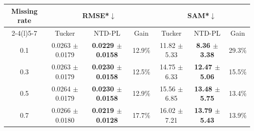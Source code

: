 \begin{tabular}{@{}c c c c c c c@{}}
\toprule
\multirow{2}{*}{Missing rate} &
\multicolumn{3}{c}{RMSE*$\downarrow$} &
\multicolumn{3}{c}{SAM*$\downarrow$} \\
\cmidrule(lr){2-4}\cmidrule(l){5-7}
& Tucker & NTD-PL & Gain
& Tucker & NTD-PL & Gain \\
\midrule
0.1 & 0.0263 \(\pm\) 0.0179 & \textbf{0.0229 \(\pm\) 0.0158} & 12.9\%
& 11.82 \(\pm\) 5.33 & \textbf{8.36 \(\pm\) 3.38} & 29.3\% \\
0.3 & 0.0263 \(\pm\) 0.0179 & \textbf{0.0230 \(\pm\) 0.0158} & 12.5\%
& 14.75 \(\pm\) 6.33 & \textbf{12.47 \(\pm\) 5.06} & 15.5\% \\
0.5 & 0.0264 \(\pm\) 0.0179 & \textbf{0.0230 \(\pm\) 0.0158} & 12.9\%
& 15.56 \(\pm\) 6.85 & \textbf{13.48 \(\pm\) 5.75} & 13.4\% \\
0.7 & 0.0266 \(\pm\) 0.0180 & \textbf{0.0219 \(\pm\) 0.0128} & 17.7\%
& 16.02 \(\pm\) 7.21 & \textbf{13.79 \(\pm\) 5.43} & 13.9\% \\
\bottomrule
\end{tabular}
